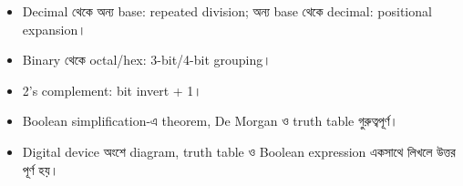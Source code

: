\begin{recapbox}
\begin{itemize}
\item Decimal থেকে অন্য base: repeated division; অন্য base থেকে decimal: positional expansion।
\item Binary থেকে octal/hex: 3-bit/4-bit grouping।
\item 2's complement: bit invert + 1।
\item Boolean simplification-এ theorem, De Morgan ও truth table গুরুত্বপূর্ণ।
\item Digital device অংশে diagram, truth table ও Boolean expression একসাথে লিখলে উত্তর পূর্ণ হয়।
\end{itemize}
\end{recapbox}

